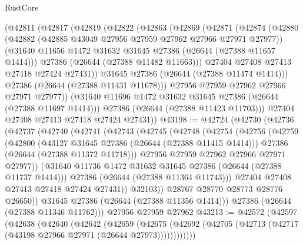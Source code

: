 \begin{lexlean}{RustCore}
\begin{coremodule}
      (@42811
        (@42817
          (@42819
            (@42822
              (@42863
                (@42869
                  (@42871
                    (@42874
                      (@42880
                        (@42882 (@42885 @43049 @27956 @27959 @27962 @27966 @27971 @27977))
                        (@31640 @11656 @1472 @31632 @31645 @27386 (@26644 (@27388 @11657 @1414)))
                        @27386
                        (@26644 (@27388 @11482 @11663)))
                      @27404
                      @27408
                      @27413
                      @27418
                      @27424
                      @27431))
                  @31645
                  @27386
                  (@26644 (@27388 @11474 @1414)))
                @27386
                (@26644 (@27388 @11431 @11678)))
              @27956
              @27959
              @27962
              @27966
              @27971
              @27977))
          (@31640 @11696 @1472 @31632 @31645 @27386 (@26644 (@27388 @11697 @1414)))
          @27386
          (@26644 (@27388 @11423 @11703)))
        @27404
        @27408
        @27413
        @27418
        @27424
        @27431))
@43198 := @42724
    (@42730
      (@42736
        (@42737
          (@42740
            (@42741
              (@42743
                (@42745
                  (@42748
                    (@42754
                      (@42756
                        (@42759
                          (@42800
                            (@43127 @31645 @27386 (@26644 (@27388 @11415 @1414)))
                            @27386
                            (@26644 (@27388 @11372 @11718)))
                          @27956
                          @27959
                          @27962
                          @27966
                          @27971
                          @27977))
                      (@31640 @11736 @1472 @31632 @31645 @27386 (@26644 (@27388 @11737 @1414)))
                      @27386
                      (@26644 (@27388 @11364 @11743)))
                    @27404
                    @27408
                    @27413
                    @27418
                    @27424
                    @27431))
                @32103))
            @28767
            @28770
            @28773
            @28776
            @26650))
        @31645
        @27386
        (@26644 (@27388 @11356 @1414)))
      @27386
      (@26644 (@27388 @11346 @11762)))
    @27956
    @27959
    @27962
@43213 := @42572
    (@42597
      (@42638
        (@42640
          (@42642
            (@42659
              (@42675
                (@42692 (@42705 (@42713 (@42717 (@43198 @27966 @27971 (@26644 @27973))))))))))))

\end{coremodule}
\end{lexlean}
